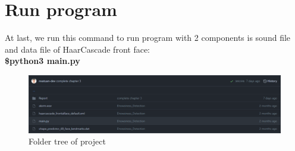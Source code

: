 \section{Run program}
    At last, we run this command to run program with 2 components is sound file and data file of HaarCascade front face: \\
    \vspace{3mm}
    \textbf{\$python3 main.py}
    \begin{figure}[H]
        \centering
        \includegraphics[width=0.8\linewidth]{img/folder-tree.PNG}
        \caption{Folder tree of project}
    \end{figure}